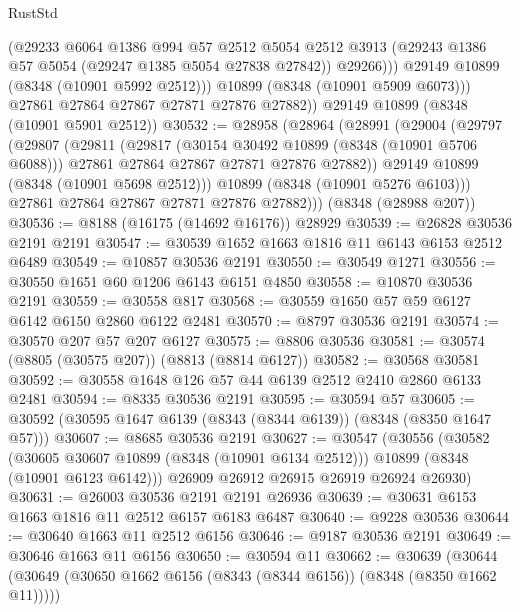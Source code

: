 \begin{lexlean}{RustStd}
\begin{coremodule}
                (@29233
                  @6064
                  @1386
                  @994
                  @57
                  @2512
                  @5054
                  @2512
                  @3913
                  (@29243 @1386 @57 @5054 (@29247 @1385 @5054 @27838 @27842))
                  @29266)))
            @29149
            @10899
            (@8348 (@10901 @5992 @2512)))
          @10899
          (@8348 (@10901 @5909 @6073)))
        @27861
        @27864
        @27867
        @27871
        @27876
        @27882))
    @29149
    @10899
    (@8348 (@10901 @5901 @2512))
@30532 := @28958
    (@28964
      (@28991
        (@29004
          (@29797
            (@29807
              (@29811
                (@29817
                  (@30154 @30492 @10899 (@8348 (@10901 @5706 @6088)))
                  @27861
                  @27864
                  @27867
                  @27871
                  @27876
                  @27882))
              @29149
              @10899
              (@8348 (@10901 @5698 @2512)))
            @10899
            (@8348 (@10901 @5276 @6103)))
          @27861
          @27864
          @27867
          @27871
          @27876
          @27882)))
    (@8348 (@28988 @207))
@30536 := @8188 (@16175 (@14692 @16176)) @28929
@30539 := @26828 @30536 @2191 @2191
@30547 := @30539 @1652 @1663 @1816 @11 @6143 @6153 @2512 @6489
@30549 := @10857 @30536 @2191
@30550 := @30549 @1271
@30556 := @30550 @1651 @60 @1206 @6143 @6151 @4850
@30558 := @10870 @30536 @2191
@30559 := @30558 @817
@30568 := @30559 @1650 @57 @59 @6127 @6142 @6150 @2860 @6122 @2481
@30570 := @8797 @30536 @2191
@30574 := @30570 @207 @57 @207 @6127
@30575 := @8806 @30536
@30581 := @30574 (@8805 (@30575 @207)) (@8813 (@8814 @6127))
@30582 := @30568 @30581
@30592 := @30558 @1648 @126 @57 @44 @6139 @2512 @2410 @2860 @6133 @2481
@30594 := @8335 @30536 @2191
@30595 := @30594 @57
@30605 := @30592 (@30595 @1647 @6139 (@8343 (@8344 @6139)) (@8348 (@8350 @1647 @57)))
@30607 := @8685 @30536 @2191
@30627 := @30547
    (@30556
      (@30582
        (@30605 @30607 @10899 (@8348 (@10901 @6134 @2512)))
        @10899
        (@8348 (@10901 @6123 @6142)))
      @26909
      @26912
      @26915
      @26919
      @26924
      @26930)
@30631 := @26003 @30536 @2191 @2191 @26936
@30639 := @30631 @6153 @1663 @1816 @11 @2512 @6157 @6183 @6487
@30640 := @9228 @30536
@30644 := @30640 @1663 @11 @2512 @6156
@30646 := @9187 @30536 @2191
@30649 := @30646 @1663 @11 @6156
@30650 := @30594 @11
@30662 := @30639
    (@30644 (@30649 (@30650 @1662 @6156 (@8343 (@8344 @6156)) (@8348 (@8350 @1662 @11)))))

\end{coremodule}
\end{lexlean}
